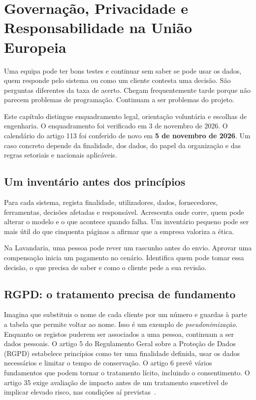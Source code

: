 \chapter{Governação, Privacidade e Responsabilidade na União Europeia}
\label{ch:governacao}

Uma equipa pode ter bons testes e continuar sem saber se pode usar os dados, quem responde pelo sistema ou como um cliente contesta uma decisão. São perguntas diferentes da taxa de acerto. Chegam frequentemente tarde porque não parecem problemas de programação. Continuam a ser problemas do projeto.

Este capítulo distingue enquadramento legal, orientação voluntária e escolhas de engenharia. O enquadramento foi verificado em 3 de novembro de 2026. O calendário do artigo 113 foi conferido de novo em \textbf{5 de novembro de 2026}. Um caso concreto depende da finalidade, dos dados, do papel da organização e das regras setoriais e nacionais aplicáveis.

\section{Um inventário antes dos princípios}
Para cada sistema, regista finalidade, utilizadores, dados, fornecedores, ferramentas, decisões afetadas e responsável. Acrescenta onde corre, quem pode alterar o modelo e o que acontece quando falha. Um inventário pequeno pode ser mais útil do que cinquenta páginas a afirmar que a empresa valoriza a ética.

Na Lavandaria, uma pessoa pode rever um rascunho antes do envio. Aprovar uma compensação inicia um pagamento no cenário. Identifica quem pode tomar essa decisão, o que precisa de saber e como o cliente pede a sua revisão.

\section{RGPD: o tratamento precisa de fundamento}
Imagina que substituis o nome de cada cliente por um número e guardas à parte a tabela que permite voltar ao nome. Isso é um exemplo de \emph{pseudonimização}. Enquanto os registos puderem ser associados a uma pessoa, continuam a ser dados pessoais. O artigo 5 do Regulamento Geral sobre a Proteção de Dados (RGPD) estabelece princípios como ter uma finalidade definida, usar os dados necessários e limitar o tempo de conservação. O artigo 6 prevê vários fundamentos que podem tornar o tratamento lícito, incluindo o consentimento. O artigo 35 exige avaliação de impacto antes de um tratamento suscetível de implicar elevado risco, nas condições aí previstas~\citep{rgpd2016}.

